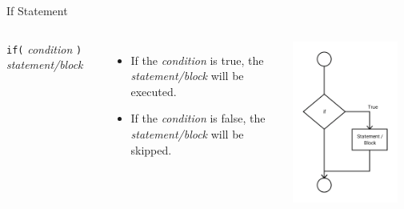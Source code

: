 \documentclass[handout]{beamer}
\begin{document}
\begin{frame}[fragile]{If Statement}
\begin{columns}
    \verb!if(! \textit{condition} \verb!)! 
    \verb!    ! \textit{statement/block}

    \vspace{2cm}

    \begin{itemize}[<+(1)->]
        \item If the \textit{condition} is true, the
            \textit{statement/block} will be executed.
        \item If the \textit{condition} is false, the 
            \textit{statement/block} will be skipped.
    \end{itemize}

    \includegraphics[width=0.9\textwidth]{images/if}
\end{columns}
\end{frame}
\end{document}
